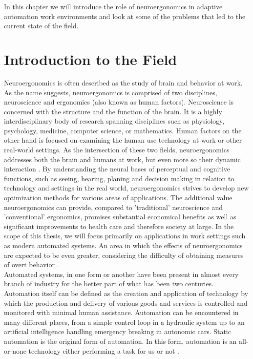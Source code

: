 
In this chapter we will introduce the role of neuroergonomics in adaptive automation work environments and look at some of the problems that led to the current state of the field. 

\section{Introduction to the Field}
Neuroergonomics is often described as the study of brain and behavior at work. As the name suggests, neuroergonomics is comprised of two disciplines, neuroscience and ergonomics (also known as human factors). Neuroscience is concerned with the structure and the function of the brain. It is a highly interdisciplinary body of research spanning disciplines such as physiology, psychology, medicine, computer science, or mathematics. Human factors on the other hand is focused on examining the human use technology at work or other real-world settings. As the intersection of these two fields, neuroergonomics addresses both the brain and humans at work, but even more so their dynamic interaction \cite{Parasuraman2003}
. By understanding the neural bases of perceptual and cognitive functions, such as seeing, hearing, planing and decision making in relation to technology and settings in the real world, neuroergonomics strives to develop new optimization methods for various areas of applications. The additional value neuroergonomics can provide, compared to 'traditional' neuroscience and 'conventional' ergonomics, promises substantial economical benefits as well as significant improvements to health care and therefore society at large. 
In the scope of this thesis, we will focus primarily on applications in work settings such as modern automated systems. An area in which the effects of neuroergonomics are expected to be even greater, considering the difficulty of obtaining measures of overt behavior \cite{Parasuraman2003}.\\
Automated systems, in one form or another have been present in almost every branch of industry for the better part of what has been two centuries. Automation itself can be defined as the creation and application of technology by which the production and delivery of various goods and services is controlled and monitored with minimal human assistance. Automation can be encountered in many different places, from a simple control loop in a hydraulic system up to an artificial intelligence handling emergency breaking in autonomic cars.%
Static automation is the original form of automation. In this form, automation is an all-or-none technology either performing a task for us or not \cite{Byrne2006}.
